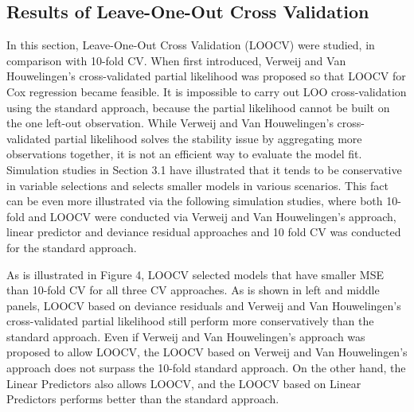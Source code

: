     \subsection {Results of Leave-One-Out Cross Validation}
	\par In this section, Leave-One-Out Cross Validation (LOOCV) were studied, in comparison with 10-fold CV. When first introduced, Verweij and Van Houwelingen's cross-validated partial likelihood was proposed so that LOOCV for Cox regression became feasible. It is impossible to carry out LOO cross-validation using the standard approach, because the partial likelihood cannot be built on the one left-out observation. While Verweij and Van Houwelingen's cross-validated partial likelihood solves the stability issue by aggregating more observations together, it is not an efficient way to evaluate the model fit. Simulation studies in Section 3.1 have illustrated that it tends to be conservative in variable selections and selects smaller models in various scenarios. This fact can be even more illustrated via the following simulation studies, where both 10-fold and LOOCV were conducted via Verweij and Van Houwelingen's approach, linear predictor and deviance residual approaches and 10 fold CV was conducted for the standard approach.
	\par As is illustrated in Figure 4, LOOCV selected models that have smaller MSE than 10-fold CV for all three CV approaches. As is shown in left and middle panels, LOOCV based on deviance residuals and Verweij and Van Houwelingen's cross-validated partial likelihood still perform more conservatively than the standard approach. Even if Verweij and Van Houwelingen's approach was proposed to allow LOOCV, the LOOCV based on Verweij and Van Houwelingen's approach does not surpass the 10-fold standard approach. On the other hand, the Linear Predictors also allows LOOCV, and the LOOCV based on Linear Predictors performs better than the standard approach.


